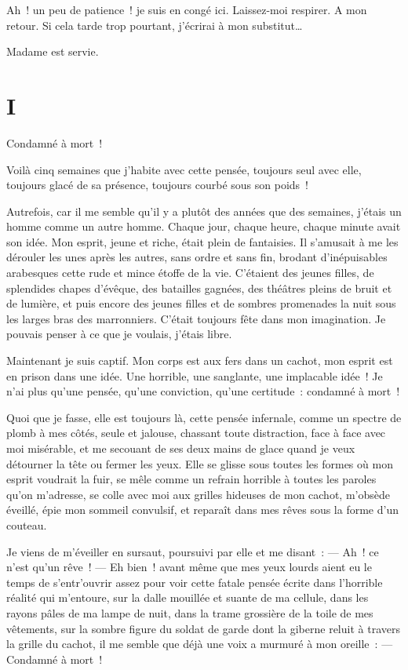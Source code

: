 \documentclass[french,twoside]{book} %
\newcommand\name[1]{#1}
\def\mednobreak{\ifdim\lastskip<\medskipamount
  \removelastskip\nopagebreak\medskip\fi}
\newcommand{\dateline}[1]{\medskip{\RaggedLeft{#1}\par}\bigskip}
\newcommand{\labelblock}[1]{\medbreak{\noindent\color{rubric}\bfseries #1}\par\mednobreak}
\begin{document}
\noindent Ah ! un peu de patience ! je suis en congé ici. Laissez-moi respirer. A mon retour. Si cela tarde trop pourtant, j’écrirai à mon substitut…\par

\labelblock{{\name UN LAQUAIS}, entrant.}

\noindent Madame est servie.
 \section[{I}]{I}
\label{ch1}\renewcommand{\leftmark}{I}


\dateline{Bicêtre}
\noindent Condamné à mort !\par
Voilà cinq semaines que j’habite avec cette pensée, toujours seul avec elle, toujours glacé de sa présence, toujours courbé sous son poids !\par
Autrefois, car il me semble qu’il y a plutôt des années que des semaines, j’étais un homme comme un autre homme. Chaque jour, chaque heure, chaque  minute avait son idée. Mon esprit, jeune et riche, était plein de fantaisies. Il s’amusait à me les dérouler les unes après les autres, sans ordre et sans fin, brodant d’inépuisables arabesques cette rude et mince étoffe de la vie. C’étaient des jeunes filles, de splendides chapes d’évêque, des batailles gagnées, des théâtres pleins de bruit et de lumière, et puis encore des jeunes filles et de sombres promenades la nuit sous les larges bras des marronniers. C’était toujours fête dans mon imagination. Je pouvais penser à ce que je voulais, j’étais libre.\par
Maintenant je suis captif. Mon corps est aux fers dans un cachot, mon esprit est en prison dans une idée. Une horrible, une sanglante, une implacable idée ! Je n’ai plus qu’une pensée, qu’une conviction, qu’une certitude : condamné à mort !\par
Quoi que je fasse, elle est toujours là, cette pensée infernale, comme un spectre de plomb à mes côtés, seule et jalouse, chassant toute distraction, face à face avec moi misérable, et me secouant de ses deux mains de glace quand je veux détourner la tête ou fermer les yeux. Elle se glisse sous toutes les formes où mon esprit voudrait la fuir, se mêle comme un refrain horrible à toutes les paroles qu’on m’adresse, se colle avec moi aux grilles hideuses de mon cachot, m’obsède éveillé, épie mon sommeil convulsif, et reparaît dans mes rêves sous la forme d’un couteau.\par
Je viens de m’éveiller en sursaut, poursuivi par elle et me disant : — Ah ! ce n’est qu’un rêve ! — Eh bien ! avant même que mes yeux lourds aient eu le temps de  s’entr’ouvrir assez pour voir cette fatale pensée écrite dans l’horrible réalité qui m’entoure, sur la dalle mouillée et suante de ma cellule, dans les rayons pâles de ma lampe de nuit, dans la trame grossière de la toile de mes vêtements, sur la sombre figure du soldat de garde dont la giberne reluit à travers la grille du cachot, il me semble que déjà une voix a murmuré à mon oreille : — Condamné à mort !
\end{document}
